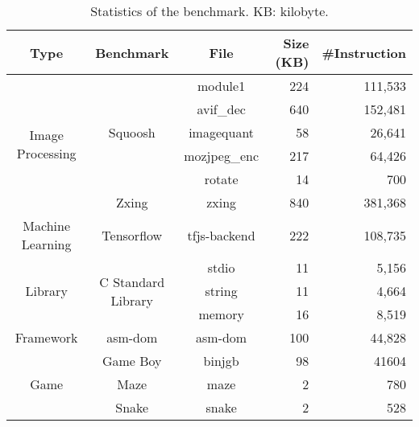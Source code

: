 \begin{table*}[htbp]
\centering
\caption{Statistics of the benchmark. KB: kilobyte. }\label{tab:benchmark}
\begin{tabular}{c | c | c | r | r}
\toprule
\textbf{Type} & \textbf{Benchmark} & \textbf{File} & \textbf{Size (KB)} & \#\textbf{Instruction} \\
\midrule
\multirow{6}{*}{Image Processing} & \multirow{5}{*}{Squoosh} & module1 & 224 & 111,533 \\

& & avif\_dec & 640 & 152,481\\

& & imagequant & 58 & 26,641\\

& & mozjpeg\_enc & 217 & 64,426\\

& & rotate & 14 & 700\\


& Zxing & zxing & 840 & 381,368\\

\hline

Machine Learning & Tensorflow & tfjs-backend & 222 & 108,735\\

\hline

\multirow{3}{*}{Library} & \multirow{3}{*}{C Standard Library} & stdio & 11 & 5,156\\

 &  & string & 11 & 4,664 \\

 &  & memory & 16 & 8,519 \\
 
\hline

Framework & asm-dom & asm-dom & 100 & 44,828\\

\hline

\multirow{3}{*}{Game} & Game Boy & binjgb & 98 & 41604\\

& Maze & maze & 2 & 780 \\

& Snake & snake & 2 & 528\\

\bottomrule
\end{tabular}
\end{table*}